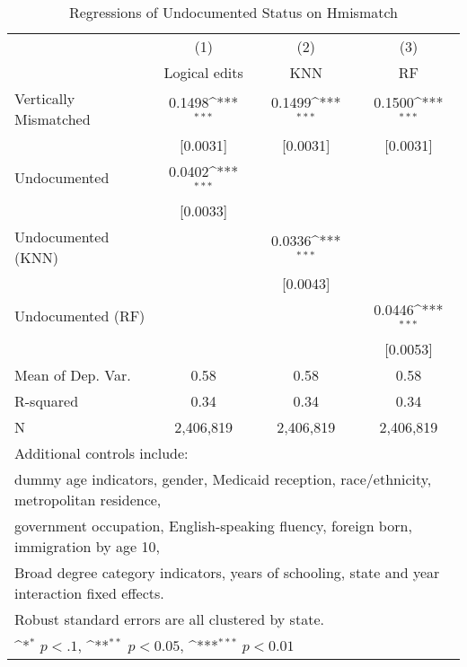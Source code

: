 \begin{table}[htbp]\centering
\def\sym#1{\ifmmode^{#1}\else\(^{#1}\)\fi}
\caption{Regressions of Undocumented Status on Hmismatch}
\begin{tabular}{l*{3}{c}}
\toprule
                    &\multicolumn{1}{c}{(1)}         &\multicolumn{1}{c}{(2)}         &\multicolumn{1}{c}{(3)}         \\
                    &Logical edits         &         KNN         &          RF         \\
\midrule
Vertically Mismatched&      0.1498\sym{***}&      0.1499\sym{***}&      0.1500\sym{***}\\
                    &    [0.0031]         &    [0.0031]         &    [0.0031]         \\
\addlinespace
Undocumented        &      0.0402\sym{***}&                     &                     \\
                    &    [0.0033]         &                     &                     \\
\addlinespace
Undocumented (KNN)  &                     &      0.0336\sym{***}&                     \\
                    &                     &    [0.0043]         &                     \\
\addlinespace
Undocumented (RF)   &                     &                     &      0.0446\sym{***}\\
                    &                     &                     &    [0.0053]         \\
\midrule
Mean of Dep. Var.   &        0.58         &        0.58         &        0.58         \\
R-squared           &        0.34         &        0.34         &        0.34         \\
N                   &   2,406,819         &   2,406,819         &   2,406,819         \\
\bottomrule
\multicolumn{4}{l}{\footnotesize Additional controls include:}\\
\multicolumn{4}{l}{\footnotesize dummy age indicators, gender, Medicaid reception, race/ethnicity, metropolitan residence,}\\
\multicolumn{4}{l}{\footnotesize government occupation, English-speaking fluency, foreign born, immigration by age 10,}\\
\multicolumn{4}{l}{\footnotesize Broad degree category indicators, years of schooling, state and year interaction fixed effects.}\\
\multicolumn{4}{l}{\footnotesize Robust standard errors are all clustered by state.}\\
\multicolumn{4}{l}{\footnotesize \sym{*} \(p<.1\), \sym{**} \(p<0.05\), \sym{***} \(p<0.01\)}\\
\end{tabular}
\end{table}
